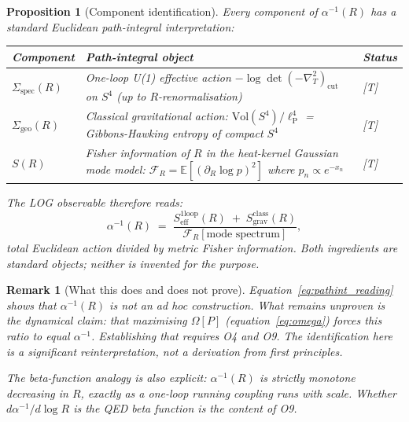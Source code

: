\documentclass[12pt,a4paper]{article}
\newcommand{\lP}{\ell_{\mathrm{P}}}
\newcommand{\ai}{\alpha^{-1}}
\newcommand{\Sg}{\Sigma_{\mathrm{geo}}}
\newcommand{\Ss}{\Sigma_{\mathrm{spec}}}
\newcommand{\Om}{\Omega}
\newtheorem{proposition}[theorem]{Proposition}
\newtheorem{remark}{Remark}[section]
\begin{document}
\begin{proposition}[Component identification]
\label{prop:components}
Every component of $\ai(R)$ has a standard
Euclidean path-integral interpretation:

\medskip
\begin{center}
\renewcommand{\arraystretch}{1.5}
\begin{tabular}{p{2.2cm}p{6.5cm}l}
\toprule
\textbf{Component} & \textbf{Path-integral object} & \textbf{Status} \\
\midrule
$\Ss(R)$ &
  One-loop U(1) effective action
  $-\log\det(-\nabla^2_T)_{\mathrm{cut}}$
  on $S^4$ (up to $R$-renormalisation) & [T] \\[6pt]
$\Sg(R)$ &
  Classical gravitational action:
  $\mathrm{Vol}(S^4)/\lP^4$ =
  Gibbons-Hawking entropy of compact $S^4$ & [T] \\[6pt]
$S(R)$ &
  Fisher information of $R$ in the
  heat-kernel Gaussian mode model:
  $\mathcal{F}_R = \mathbb{E}[(\partial_R \log p)^2]$
  where $p_n \propto e^{-x_n}$ & [T] \\
\bottomrule
\end{tabular}
\end{center}

\medskip
\noindent The LOG observable therefore reads:
\begin{equation}
\boxed{
  \ai(R)
  \;=\;
  \frac{S_{\mathrm{eff}}^{\mathrm{1loop}}(R)
        \;+\; S_{\mathrm{grav}}^{\mathrm{class}}(R)}
       {\mathcal{F}_R[\text{mode spectrum}]},
}
\label{eq:pathint_reading}
\end{equation}
\emph{total Euclidean action divided by metric Fisher
information}. Both ingredients are standard objects;
neither is invented for the purpose.
\end{proposition}

\begin{remark}[What this does and does not prove]
Equation~\eqref{eq:pathint_reading} shows that $\ai(R)$
is not an ad hoc construction.
What remains unproven is the dynamical claim: that
maximising $\Om[P]$ (equation~\eqref{eq:omega})
\emph{forces} this ratio to equal $\alpha^{-1}$.
Establishing that requires O4 and O9.
The identification here is a significant reinterpretation,
not a derivation from first principles.

The beta-function analogy is also explicit:
$\ai(R)$ is strictly monotone decreasing in $R$,
exactly as a one-loop running coupling runs with scale.
Whether $d\ai/d\log R$ is the QED beta function
is the content of O9.
\end{remark}
\end{document}
